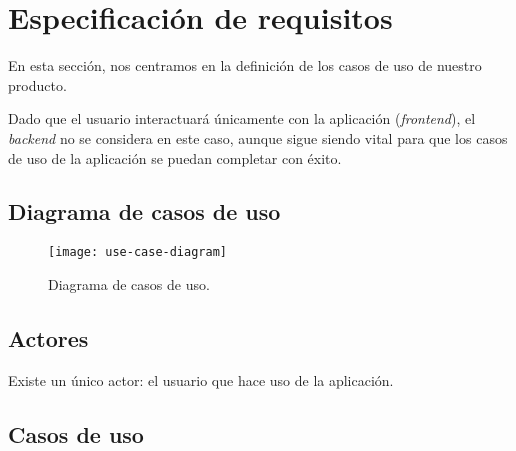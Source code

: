 \newpage

\section{Especificación de requisitos}

En esta sección, nos centramos en la definición de los casos de uso de nuestro producto.

Dado que el usuario interactuará únicamente con la aplicación (\emph{frontend}), el \emph{backend} no se considera en este caso, aunque sigue siendo vital para que los casos de uso de la aplicación se puedan completar con éxito.

\subsection{Diagrama de casos de uso}



\begin{figure}[h!]
	\centering
	\texttt{[image: use-case-diagram]}
	\vspace{-0.5cm}
	\caption{Diagrama de casos de uso.}
	\label{flutter-widgets}
\end{figure}

\subsection{Actores}

Existe un único actor: el usuario que hace uso de la aplicación.


\subsection{Casos de uso}

